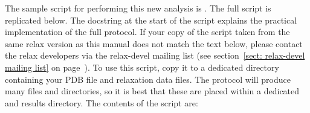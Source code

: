 \begin{htmlonly}
\begin{htmlonly}
The sample script for performing this new analysis is .  The full script is replicated below.  The docstring at the start of the script explains the practical implementation of the full protocol.  If your copy of the  script taken from the same relax version as this manual does not match the text below, please contact the relax developers via the relax-devel mailing list (see section~\ref{sect: relax-devel mailing list} on page~\pageref{sect: relax-devel mailing list}).  To use this script, copy it to a dedicated directory containing your PDB file and relaxation data files.  The protocol will produce many files and directories, so it is best that these are placed within a dedicated and results directory.  The contents of the script are:


\end{htmlonly}
\end{htmlonly}
